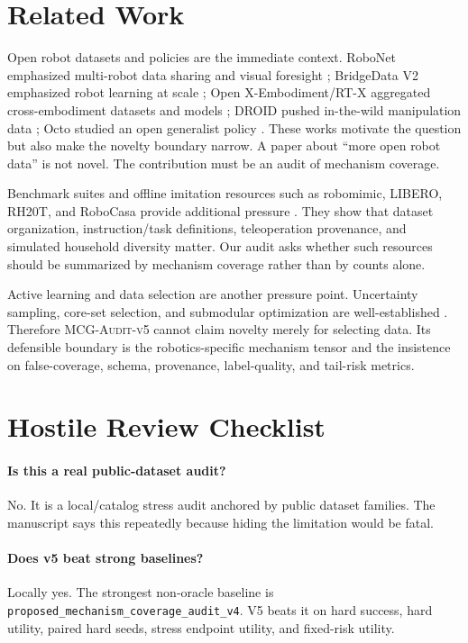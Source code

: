 \documentclass{article}
\newcommand{\method}{\textsc{MCG-Audit-v5}}
\begin{document}
\section{Related Work}
Open robot datasets and policies are the immediate context. RoboNet emphasized multi-robot data sharing and visual foresight \citep{dasari2019robonet}; BridgeData V2 emphasized robot learning at scale \citep{walke2023bridgedata}; Open X-Embodiment/RT-X aggregated cross-embodiment datasets and models \citep{openx2023}; DROID pushed in-the-wild manipulation data \citep{khazatsky2024droid}; Octo studied an open generalist policy \citep{octo2024}. These works motivate the question but also make the novelty boundary narrow. A paper about ``more open robot data'' is not novel. The contribution must be an audit of mechanism coverage.

Benchmark suites and offline imitation resources such as robomimic, LIBERO, RH20T, and RoboCasa provide additional pressure \citep{mandlekar2021robomimic,liu2023libero,fang2023rh20t,robocasa2024}. They show that dataset organization, instruction/task definitions, teleoperation provenance, and simulated household diversity matter. Our audit asks whether such resources should be summarized by mechanism coverage rather than by counts alone.

Active learning and data selection are another pressure point. Uncertainty sampling, core-set selection, and submodular optimization are well-established \citep{settles2009active,sener2018coreset,nemhauser1978submodular,krause2014submodular}. Therefore \method{} cannot claim novelty merely for selecting data. Its defensible boundary is the robotics-specific mechanism tensor and the insistence on false-coverage, schema, provenance, label-quality, and tail-risk metrics.

\section{Hostile Review Checklist}
\paragraph{Is this a real public-dataset audit?}
No. It is a local/catalog stress audit anchored by public dataset families. The manuscript says this repeatedly because hiding the limitation would be fatal.

\paragraph{Does v5 beat strong baselines?}
Locally yes. The strongest non-oracle baseline is \texttt{proposed\_mechanism\_coverage\_audit\_v4}. V5 beats it on hard success, hard utility, paired hard seeds, stress endpoint utility, and fixed-risk utility.
\end{document}
